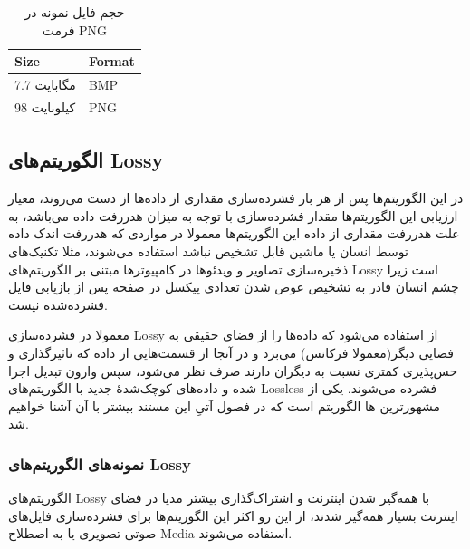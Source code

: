 \begin{table}
	\centering
	\caption{حجم فایل نمونه در فرمت PNG}
	\label{compare_1}
	\begin{tabular}{@{}ll@{}}
	\toprule
	Size & Format \\ \midrule
	7.7 مگابایت & BMP \\
	98 کیلوبایت & PNG \\ \bottomrule
	\end{tabular}
	\end{table}



\subsection{الگوریتم‌های Lossy}

در این الگوریتم‌ها پس از هر بار فشرده‌سازی مقداری از داده‌ها از دست می‌روند، معیار ارزیابی این الگوریتم‌ها 
مقدار فشرده‌سازی با توجه به میزان هدررفت داده می‌باشد، به علت هدررفت مقداری از داده این الگوریتم‌ها معمولا در 
مواردی که هدررفت اندک داده توسط انسان یا ماشین قابل تشخیص نباشد استفاده می‌شوند،‌ مثلا تکنیک‌های 
ذخیره‌سازی تصاویر و ویدئو‌ها در کامپیوترها مبتنی بر الگوریتم‌های Lossy 
است زیرا چشم انسان قادر به تشخیص عوض شدن تعدادی پیکسل در صفحه پس از بازیابی فایل فشرده‌شده نیست. 

معمولا در فشرده‌سازی Lossy از 
استفاده می‌شود که داده‌ها را از فضای حقیقی به فضایی دیگر(معمولا فرکانس) می‌برد و در آنجا از قسمت‌هایی از داده که تاثیرگذاری و حس‌پذیری کمتری
نسبت به دیگران دارند صرف نظر می‌شود، سپس وارون تبدیل اجرا شده و داده‌های کوچک‌شدهٔ جدید با الگوریتم‌های 
Lossless فشرده می‌شوند. یکی از 
مشهورترین
ها الگوریتم 
است که در فصول آتیِ این مستند بیشتر با آن آشنا خواهیم شد. 

\subsubsection{نمونه‌های الگوریتم‌های Lossy}
الگوریتم‌های Lossy با همه‌گیر شدن اینترنت و اشتراک‌گذاری 
بیشتر مدیا در فضای اینترنت بسیار همه‌گیر شدند، از این رو اکثر این الگوریتم‌ها برای فشرده‌سازی فایل‌های صوتی-تصویری یا به اصطلاح 
Media 
استفاده می‌شوند. 


